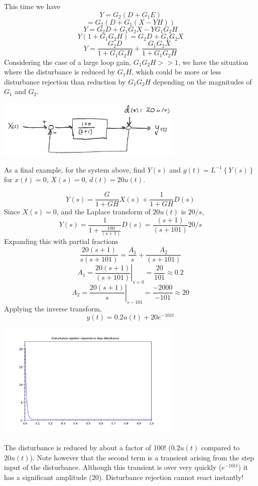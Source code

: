 This time we have
\[
Y = G_2(D+G_1E)
\]
\[
= G_2\left ( D+G_1(X-YH) \right )
\]
\[
Y = G_2D + G_1G_2X - YG_1G_2H
\]
\[
Y(1+G_1G_2H) = G_2D + G_1G_2X
\]
\[
Y = \frac{G_2D}{1+G_1G_2H}  +  \frac{G_1G_2X}{1+G_1G_2H}
\]
Considering the case of a large loop gain, $G_1G_2H >> 1$, we have the situation where the disturbance is reduced by $G_1H$, which could be more or less disturbance rejection than reduction by $G_1G_2H$
depending on the magnitudes of $G_1$ and $G_2$.





\begin{ExampleSmall}\label{stepdisturbanceexample}

\includegraphics[width=3.5in]{figs06/00778a.png}

As a final example, for the system above, find $Y(s)$ and $y(t) = L^{-1} \left \{ Y(s) \right \}$ for $x(t) = 0$, $X(s) = 0$, $d(t) = 20u(t)$.

\vspace{0.25in}

\[
Y(s) = \frac{G}{1+GH}X(s) +  \frac{1}{1+GH}D(s)
\]
Since $X(s) = 0$, and the Laplace transform of $20u(t)$ is $20/s$,
\[
Y(s) = \frac{1}{1+\frac{100}{(s+1)}} D(s)  = \frac{(s+1)}{(s+101)} 20/s
\]
Expanding this with partial fractions
\[
\frac{20(s+1)}{s(s+101)} =  \frac{A_1}{s} +  \frac{A_2}{(s+101)}
\]
\[
A_1 = \left . \frac{20(s+1)}{(s+101)}\right | _{s=0} = \frac{20}{101} \approx 0.2
\]
\[
A_2 = \left . \frac{20(s+1)}{s}\right | _{s-101} = \frac{-2000}{-101} \approx 20
\]
Applying the inverse transform,
\[
y(t) = 0.2u(t) + 20e^{-101t}
\]

\includegraphics[width=3.5in]{figs06/stepdisturba.png}

The disturbance is reduced by about a factor of 100! ($0.2u(t)$ compared to $20u(t)$).  Note however that the second term is a transient arising from the step input of the disturbance.  Although this transient is over very quickly ($e^{-101t}$) it has a significant amplitude (20).   Disturbance rejection cannot react instantly!


\end{ExampleSmall}


